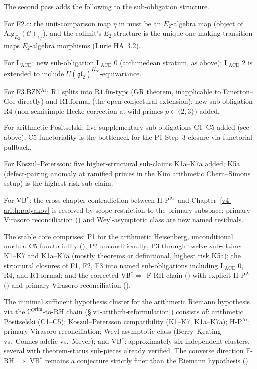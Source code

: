 The second pass adds the following to the sub-obligation structure.

For F2.c: the unit-comparison map \(\eta\) in
 must be an \(E_{2}\)-algebra map
(object of \(\mathrm{Alg}_{E_{2}}(\mathcal{C})_{\mathbb{1}/}\)),
and the colimit's \(E_{2}\)-structure is the unique one making
transition maps \(E_{2}\)-algebra morphisms (Lurie HA~3.2).

For \(\mathrm{L}_{\mathrm{ACD}}\): new sub-obligation
\(\mathrm{L}_{\mathrm{ACD}}.0\) (archimedean stratum, as above);
\(\mathrm{L}_{\mathrm{ACD}}.2\) is extended to include
\(U(\mathfrak{gl}_{2})^{K_{\infty}}\)-equivariance.

For F3.BZN\(^{\mathrm{Ar}}\): R1 splits into
\(\mathrm{R1.fin\text{-}type}\) (GR theorem, inapplicable to
Emerton--Gee directly) and \(\mathrm{R1.formal}\) (the open
conjectural extension); new sub-obligation R4 (non-semisimple
Hecke correction at wild primes \(p\in\{2,3\}\)) added.

For arithmetic Positselski: five supplementary sub-obligations
C1--C5 added (see above); C5 functoriality is the bottleneck for
the P1 Step~3 closure via functorial pullback.

For Koszul--Petersson: five higher-structural sub-claims K1a--K7a
added; K5a (defect-pairing anomaly at ramified primes in the Kim
arithmetic Chern--Simons setup) is the highest-risk sub-claim.

For VB\(^{*}\): the cross-chapter contradiction between
H-P\(^{\mathrm{Ar}}\) and Chapter~\ref{v4-arith:polyakov} is
resolved by scope restriction to the primary subspace;
primary-Virasoro reconciliation ()
and Weyl-asymptotic class are new named residuals.

The stable core comprises:
P1 for the arithmetic Heisenberg, unconditional modulo C5
functoriality ();
P2 unconditionally;
P3 through twelve sub-claims K1--K7 and K1a--K7a (mostly theorems
or definitional, highest risk K5a);
the structural closures of F1, F2, F3 into named sub-obligations
including \(\mathrm{L}_{\mathrm{ACD}}.0\), R4, and
\(\mathrm{R1.formal}\);
and the corrected VB\(^{*}\Rightarrow\) F-RH chain
() with explicit
H-P\(^{\mathrm{Ar}}\) () and
primary-Virasoro reconciliation
().

The minimal sufficient hypothesis cluster for the arithmetic Riemann
hypothesis via the \(\mathcal{V}^{\mathrm{prim}}\)-to-RH chain
(\S\ref{v4-arith:rh-reformulation}) consists of:
arithmetic Positselski (C1--C5);
Koszul--Petersson compatibility (K1--K7, K1a--K7a);
H-P\(^{\mathrm{Ar}}\);
primary-Virasoro reconciliation;
Weyl-asymptotic class (Berry--Keating vs.~Connes adelic vs.~Meyer);
and VB\(^{*}\): approximately six independent clusters,
several with theorem-status sub-pieces already verified.
The converse direction F-RH \(\Rightarrow\) VB\(^{*}\) remains
a conjecture strictly finer than the Riemann hypothesis
().

